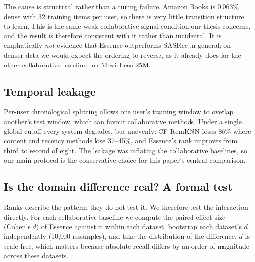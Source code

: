 \documentclass[runningheads,a4paper]{llncs}
\begin{document}
The cause is structural rather than a tuning failure. Amazon Books is 0.063\% dense with 32
training items per user, so there is very little transition structure to learn. This is the
same weak-collaborative-signal condition our thesis concerns, and the result is therefore
consistent with it rather than incidental. It is emphatically \emph{not} evidence that
Essence outperforms SASRec in general; on denser data we would expect the ordering to
reverse, as it already does for the other collaborative baselines on MovieLens-25M.

\subsection{Temporal leakage}\label{sec:leak}

Per-user chronological splitting allows one user's training window to overlap another's
test window, which can favour collaborative methods. Under a single global cutoff every
system degrades, but unevenly: CF-ItemKNN loses 86\% where content and recency methods lose
37--45\%, and Essence's rank improves from third to second of eight. The leakage was
inflating the collaborative baselines, so our main protocol is the conservative choice for
this paper's central comparison.

\subsection{Is the domain difference real? A formal test}\label{sec:interaction}

Ranks describe the pattern; they do not test it. We therefore test the interaction directly.
For each collaborative baseline we compute the paired effect size (Cohen's $d$) of Essence
against it within each dataset, bootstrap each dataset's $d$ independently (10{,}000
resamples), and take the distribution of the difference. $d$ is scale-free, which matters
because absolute recall differs by an order of magnitude across these datasets.
\end{document}
